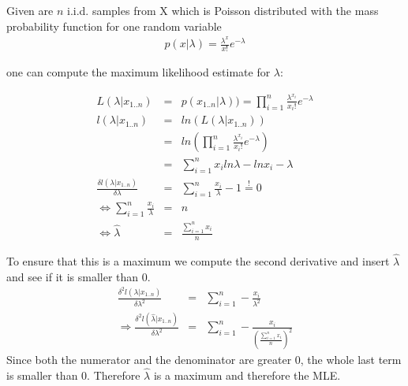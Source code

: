 \documentclass{article}
\begin{document}
Given are $n$ i.i.d. samples from X which is Poisson distributed with the mass probability function for one random variable
\begin{eqnarray}
p(x|\lambda) = \frac{\lambda^x}{x!}e^{-\lambda}
\end{eqnarray}

one can compute the maximum likelihood estimate for $\lambda$:

\begin{eqnarray}
L(\lambda|x_{1..n}) &=& p(x_{1..n}|\lambda)) = \prod_{i=1}^{n} \frac{\lambda^{x_i}}{x_i!}e^{-\lambda}\\
l(\lambda|x_{1..n}) &=& ln(L(\lambda|x_{1..n}))\\
&=& ln\left(\prod_{i=1}^{n} \frac{\lambda^{x_i}}{x_i!}e^{-\lambda}\right)\\
&=& \sum_{i = 1}^{n} x_i ln \lambda - ln x_i - \lambda\\
\frac{\delta l(\lambda|x_{1..n})}{\delta \lambda} &=& \sum_{i = 1}^{n} \frac{x_i}{\lambda} - 1 \overset{!}{=} 0\\
\Leftrightarrow \sum_{i = 1}^{n} \frac{x_i}{\lambda} &=& n\\
\Leftrightarrow \hat{\lambda} &=& \frac{\sum_{i = 1}^{n} x_i}{n}
\end{eqnarray}

To ensure that this is a maximum we compute the second derivative and insert $\hat{\lambda}$ and see if it is smaller than 0.
\begin{eqnarray}
\frac{\delta^2 l(\lambda|x_{1..n})}{\delta \lambda^2} &=& \sum_{i = 1}^{n} -\frac{x_i}{\lambda^2}\\
\Rightarrow \frac{\delta^2 l(\hat{\lambda}|x_{1..n})}{\delta \lambda^2} &=& \sum_{i = 1}^{n} -\frac{x_i}{\left(\frac{\sum_{i = 1}^{n} x_i}{n}\right)^2}
\end{eqnarray}
Since both the numerator and the denominator are greater 0, the whole last term is smaller than 0. Therefore $\hat{\lambda}$ is a maximum and therefore the MLE.
\end{document}
